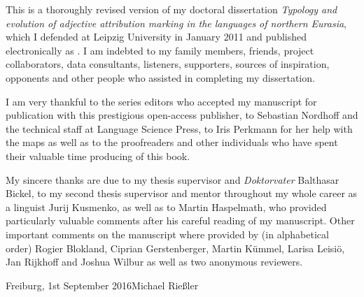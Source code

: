 

This is a thoroughly revised version of my doctoral dissertation \textit{Typology and evolution of adjective attribution marking in the languages of northern Eurasia}, which I defended at Leipzig University in January 2011 and published electronically as \citet{riesler2011a}. I am indebted to my family members, friends, project collaborators, data consultants, listeners, supporters, sources of inspiration, opponents and other people who assisted in completing my dissertation. 

I am very thankful to the series editors who accepted my manuscript for publication with this prestigious open-access publisher, to Sebastian Nordhoff and the technical staff at Language Science Press, to Iris Perkmann for her help with the maps as well as to the proofreaders and other individuals who have spent their valuable time producing of this book. 

My sincere thanks are due to my thesis supervisor and \emph{Doktorvater} Balthasar Bickel, to my second thesis supervisor and mentor throughout my whole career as a linguist Jurij Kusmenko, as well as to Martin Haspelmath, who provided particularly valuable comments after his careful reading of my manuscript. Other important comments on the manuscript where provided by (in alphabetical order) Rogier Blokland, Ciprian Gerstenberger, Martin Kümmel, Larisa Leisiö, Jan Rijkhoff and Joshua Wilbur as well as two anonymous reviewers.

\bigskip

\noindent
Freiburg, 1st September 2016\hfill Michael Rießler
